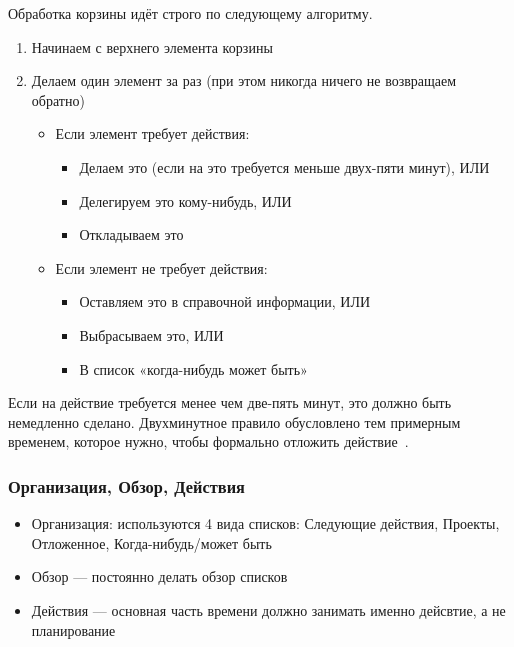 \documentclass{../industrial-development}
\begin{document}
Обработка корзины идёт строго по следующему алгоритму.
\begin{enumerate}
\item Начинаем с верхнего элемента корзины
\item Делаем один элемент за раз (при этом никогда ничего не возвращаем обратно)
  \begin{itemize}
  \item Если элемент требует действия:
    \begin{itemize}
    \item Делаем это (если на это требуется меньше двух-пяти минут), ИЛИ
    \item Делегируем это кому-нибудь, ИЛИ
    \item Откладываем это
    \end{itemize}
  \item Если элемент не требует действия:
    \begin{itemize}
    \item Оставляем это в справочной информации, ИЛИ
    \item Выбрасываем это, ИЛИ
    \item В список «когда-нибудь может быть»
    \end{itemize}
  \end{itemize}
\end{enumerate}
Если на действие требуется менее чем две-пять минут, это должно быть немедленно сделано. Двухминутное правило обусловлено тем примерным временем, которое нужно, чтобы формально отложить действие~\cite{GTDWikipedia}.

\begin{frame} \frametitle{Организация, Обзор, Действия}
  \begin{itemize}
  \item Организация: используются 4 вида списков: Следующие действия, Проекты, Отложенное, Когда-нибудь/может быть
  \item Обзор --- постоянно делать обзор списков
  \item Действия --- основная часть времени должно занимать именно дейсвтие, а не планирование
  \end{itemize}
\end{frame}

\lecturenotes
\end{document}
